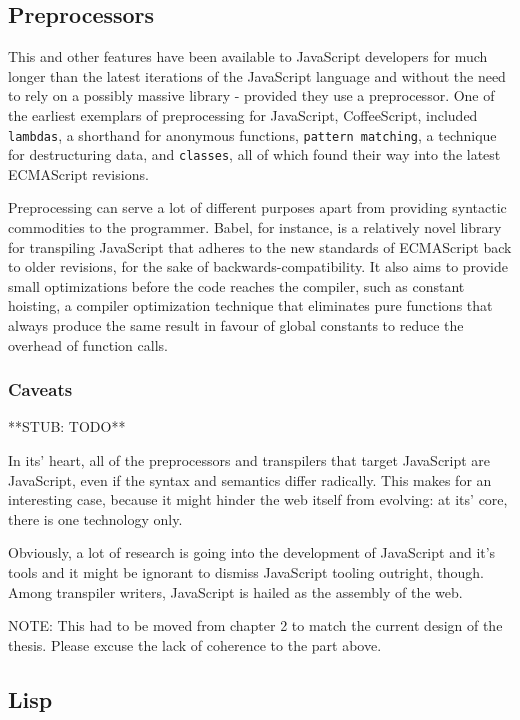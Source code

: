 \documentclass[oneside,11pt,xetex]{scrbook}
\begin{document}
\subsection{Preprocessors}

This and other features have been available to JavaScript developers for much
longer than the latest iterations of the JavaScript language and without
the need to rely on a possibly massive library - provided they use a preprocessor.
One of the earliest exemplars of preprocessing for JavaScript, CoffeeScript, included
\texttt{lambdas}, a shorthand for anonymous functions, \texttt{pattern matching},
a technique for destructuring data, and \texttt{classes}, all of which found
their way into the latest ECMAScript revisions.

Preprocessing can serve a lot of different purposes apart from providing
syntactic commodities to the programmer. Babel, for instance, is a relatively
novel library for transpiling JavaScript that adheres to the new standards
of ECMAScript back to older revisions, for the sake of backwards-compatibility.
It also aims to provide small optimizations before the code reaches the compiler,
such as constant hoisting, a compiler optimization technique that eliminates
pure functions that always produce the same result in favour of global constants
to reduce the overhead of function calls.

\subsubsection{Caveats} %

**STUB: TODO**

In its' heart, all of the preprocessors and transpilers that target JavaScript
are JavaScript, even if the syntax and semantics differ radically. This makes
for an interesting case, because it might hinder the web itself from evolving:
at its' core, there is one technology only.

Obviously, a lot of research is going into the development of JavaScript and
it's tools and it might be ignorant to dismiss JavaScript tooling outright,
though. Among transpiler writers, JavaScript is hailed as the assembly of the web.

NOTE: This had to be moved from chapter 2 to match the current design of the thesis. Please
excuse the lack of coherence to the part above.

\subsection{Lisp}
\end{document}
